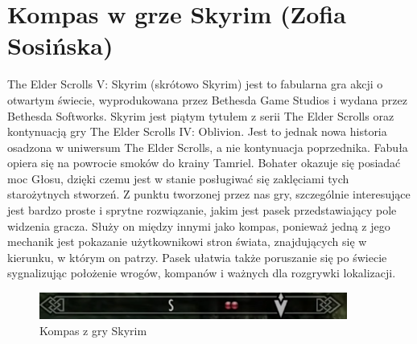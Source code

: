 \section{Kompas w grze Skyrim (Zofia Sosińska)}\label{chap:skrm}

The Elder Scrolls V: Skyrim (skrótowo Skyrim) jest to fabularna gra akcji o otwartym świecie, 
wyprodukowana przez Bethesda Game Studios i wydana przez Bethesda Softworks. Skyrim jest piątym 
tytułem z serii The Elder Scrolls oraz kontynuacją gry The Elder Scrolls IV: Oblivion. Jest to jednak 
nowa historia osadzona w uniwersum The Elder Scrolls, a nie kontynuacja poprzednika. Fabuła opiera się 
na powrocie smoków do krainy Tamriel. Bohater okazuje się posiadać moc Głosu, dzięki czemu jest w stanie 
posługiwać się zaklęciami tych starożytnych stworzeń.
Z punktu tworzonej przez nas gry, szczególnie interesujące jest  bardzo proste i sprytne rozwiązanie,
jakim jest pasek przedstawiający pole widzenia gracza. Służy on między innymi jako kompas, ponieważ 
jedną z jego mechanik jest pokazanie użytkownikowi stron świata, znajdujących się w kierunku, w którym 
on patrzy. Pasek ułatwia także poruszanie się po świecie sygnalizując położenie wrogów, kompanów i ważnych 
dla rozgrywki lokalizacji.


	\begin{figure}[htbp]
		\centering
		\includegraphics[width=0.9\textwidth]{images/ui/compassSkyrim.png}
		\caption{Kompas z gry Skyrim}\label{fig:Fallout}
	\end{figure}

